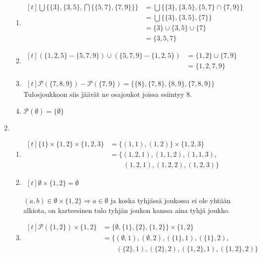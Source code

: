 \documentclass[a4paper,11pt,draft]{article}
\newenvironment{lalign}%
{\begin{math}\begin{aligned}[t]}%
{\end{aligned}\end{math}}
\begin{document}
\begin{enumerate}
\begin{enumerate}
  \item
    \begin{lalign}
      \bigcup\{\{3\},\{3,5\},\bigcap\{\{5,7\},\{7,9\}\}\}
      &= \bigcup\{\{3\},\{3,5\},\{5,7\} \cap \{7,9\}\} \\
      &= \bigcup\{\{3\},\{3,5\},\{7\}\} \\
      &= \{3\} \cup \{3,5\} \cup \{7\} \\
      &= \{3,5,7\}
    \end{lalign}

  \item
    \begin{lalign}
      (\{1,2,5\} - \{5,7,9\}) \cup (\{5,7,9\} - \{1,2,5\})
      &= \{1,2\} \cup \{7,9\} \\
      &= \{1,2,7,9\}
    \end{lalign}

  \item
    \begin{lalign}
      \mathcal{P}(\{7,8,9\}) - \mathcal{P}(\{7,9\})
      = \{\{8\}, \{7,8\}, \{8,9\}, \{7,8,9\}\}
    \end{lalign}
    Tulosjoukkoon siis jäävät ne osajoukot joissa esiintyy 8.
  \item
    $\mathcal{P}(\emptyset) = \{\emptyset\}$
  \end{enumerate}

\item
  \begin{enumerate}
  \item
    \begin{lalign}
      \{1\} \times \{1,2\} \times \{1,2,3\}
      &= \{(1,1), (1,2)\} \times \{1,2,3\} \\
      &= \{(1,2,1), (1,1,2), (1,1,3),\\
      &\qquad(1,2,1), (1,2,2), (1,2,3)\}
    \end{lalign}

  \item
    \begin{lalign}
      \emptyset \times \{1,2\} = \emptyset
    \end{lalign}

    $(a,b) \in \emptyset \times \{1,2\} \Rightarrow a \in \emptyset$
    ja koska tyhjässä joukossa ei ole yhtään alkiota, on karteesinen
    tulo tyhjän joukon kanssa aina tyhjä joukko.

  \item
    \begin{lalign}
      \mathcal{P}(\{1,2\}) \times \{1,2\}
      &= \{\emptyset, \{1\}, \{2\}, \{1,2\}\} \times \{1,2\} \\
      &= \{(\emptyset, 1), (\emptyset, 2), (\{1\}, 1), (\{1\}, 2),\\
      &\qquad(\{2\}, 1), (\{2\}, 2), (\{1,2\}, 1), (\{1,2\}, 2)\}
    \end{lalign}


\end{enumerate}
\end{enumerate}
\end{document}
